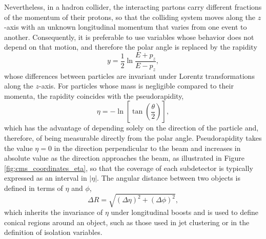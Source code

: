 %
Nevertheless, in a hadron collider, the interacting partons carry different fractions of the momentum of their protons, so that the colliding system moves along the $z$-axis with an unknown longitudinal momentum that varies from one event to another. Consequently, it is preferable to use variables whose behavior does not depend on that motion, and therefore the polar angle is replaced by the rapidity
\begin{equation}
    y = \frac{1}{2}\ln\frac{E+p_z}{E-p_z},
    \label{eq:rapidity}
\end{equation}
whose differences between particles are invariant under Lorentz transformations along the $z$-axis. For particles whose mass is negligible compared to their momenta, the rapidity coincides with the pseudorapidity,
\begin{equation}
    \eta = -\ln\left[\tan\left(\frac{\theta}{2}\right)\right],
    \label{eq:eta}
\end{equation}
which has the advantage of depending solely on the direction of the particle and, therefore, of being measurable directly from the polar angle. Pseudorapidity takes the value $\eta=0$ in the direction perpendicular to the beam and increases in absolute value as the direction approaches the beam, as illustrated in Figure \ref{fig:cms_coordinates_eta}, so that the coverage of each subdetector is typically expressed as an interval in $|\eta|$. The angular distance between two objects is defined in terms of $\eta$ and $\phi$,
\begin{equation}
    \Delta R = \sqrt{(\Delta\eta)^2+(\Delta\phi)^2},
    \label{eq:deltaR}
\end{equation}
which inherits the invariance of $\eta$ under longitudinal boosts and is used to define conical regions around an object, such as those used in jet clustering or in the definition of isolation variables.\medskip
%
